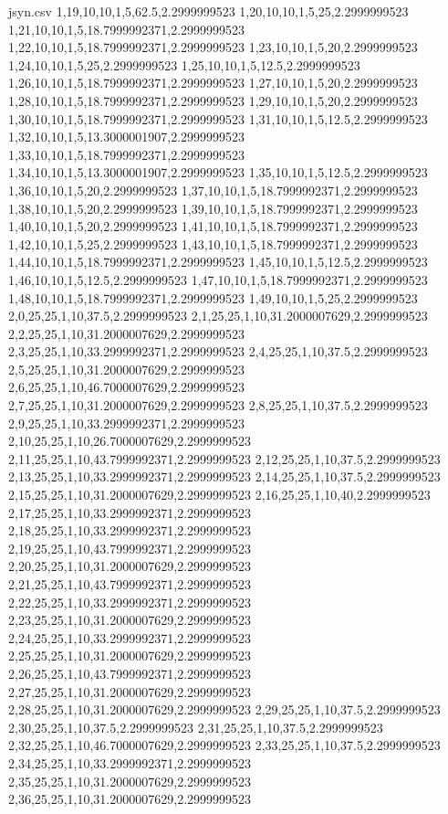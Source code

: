 \begin{filecontents*}{jsyn.csv}
1,19,10,10,1,5,62.5,2.2999999523
1,20,10,10,1,5,25,2.2999999523
1,21,10,10,1,5,18.7999992371,2.2999999523
1,22,10,10,1,5,18.7999992371,2.2999999523
1,23,10,10,1,5,20,2.2999999523
1,24,10,10,1,5,25,2.2999999523
1,25,10,10,1,5,12.5,2.2999999523
1,26,10,10,1,5,18.7999992371,2.2999999523
1,27,10,10,1,5,20,2.2999999523
1,28,10,10,1,5,18.7999992371,2.2999999523
1,29,10,10,1,5,20,2.2999999523
1,30,10,10,1,5,18.7999992371,2.2999999523
1,31,10,10,1,5,12.5,2.2999999523
1,32,10,10,1,5,13.3000001907,2.2999999523
1,33,10,10,1,5,18.7999992371,2.2999999523
1,34,10,10,1,5,13.3000001907,2.2999999523
1,35,10,10,1,5,12.5,2.2999999523
1,36,10,10,1,5,20,2.2999999523
1,37,10,10,1,5,18.7999992371,2.2999999523
1,38,10,10,1,5,20,2.2999999523
1,39,10,10,1,5,18.7999992371,2.2999999523
1,40,10,10,1,5,20,2.2999999523
1,41,10,10,1,5,18.7999992371,2.2999999523
1,42,10,10,1,5,25,2.2999999523
1,43,10,10,1,5,18.7999992371,2.2999999523
1,44,10,10,1,5,18.7999992371,2.2999999523
1,45,10,10,1,5,12.5,2.2999999523
1,46,10,10,1,5,12.5,2.2999999523
1,47,10,10,1,5,18.7999992371,2.2999999523
1,48,10,10,1,5,18.7999992371,2.2999999523
1,49,10,10,1,5,25,2.2999999523
2,0,25,25,1,10,37.5,2.2999999523
2,1,25,25,1,10,31.2000007629,2.2999999523
2,2,25,25,1,10,31.2000007629,2.2999999523
2,3,25,25,1,10,33.2999992371,2.2999999523
2,4,25,25,1,10,37.5,2.2999999523
2,5,25,25,1,10,31.2000007629,2.2999999523
2,6,25,25,1,10,46.7000007629,2.2999999523
2,7,25,25,1,10,31.2000007629,2.2999999523
2,8,25,25,1,10,37.5,2.2999999523
2,9,25,25,1,10,33.2999992371,2.2999999523
2,10,25,25,1,10,26.7000007629,2.2999999523
2,11,25,25,1,10,43.7999992371,2.2999999523
2,12,25,25,1,10,37.5,2.2999999523
2,13,25,25,1,10,33.2999992371,2.2999999523
2,14,25,25,1,10,37.5,2.2999999523
2,15,25,25,1,10,31.2000007629,2.2999999523
2,16,25,25,1,10,40,2.2999999523
2,17,25,25,1,10,33.2999992371,2.2999999523
2,18,25,25,1,10,33.2999992371,2.2999999523
2,19,25,25,1,10,43.7999992371,2.2999999523
2,20,25,25,1,10,31.2000007629,2.2999999523
2,21,25,25,1,10,43.7999992371,2.2999999523
2,22,25,25,1,10,33.2999992371,2.2999999523
2,23,25,25,1,10,31.2000007629,2.2999999523
2,24,25,25,1,10,33.2999992371,2.2999999523
2,25,25,25,1,10,31.2000007629,2.2999999523
2,26,25,25,1,10,43.7999992371,2.2999999523
2,27,25,25,1,10,31.2000007629,2.2999999523
2,28,25,25,1,10,31.2000007629,2.2999999523
2,29,25,25,1,10,37.5,2.2999999523
2,30,25,25,1,10,37.5,2.2999999523
2,31,25,25,1,10,37.5,2.2999999523
2,32,25,25,1,10,46.7000007629,2.2999999523
2,33,25,25,1,10,37.5,2.2999999523
2,34,25,25,1,10,33.2999992371,2.2999999523
2,35,25,25,1,10,31.2000007629,2.2999999523
2,36,25,25,1,10,31.2000007629,2.2999999523

\end{filecontents*}
